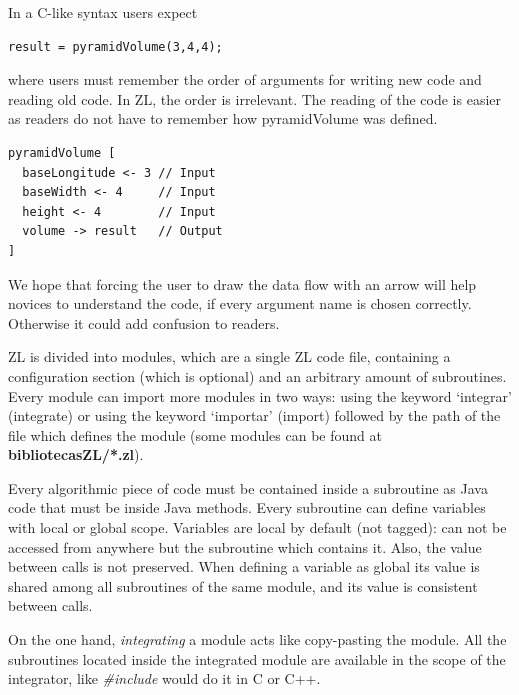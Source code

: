 \documentclass{report}
\begin{document}
	In a C-like syntax users expect
	
		\vspace{10px}
	
\begin{BVerbatim}
result = pyramidVolume(3,4,4);
\end{BVerbatim}
	
	\vspace{10px}
	
	where users must remember the order of arguments 
	for writing new code and reading old code.
	In ZL, the order is irrelevant. The reading of the code 
	is easier as readers do not have to remember how 
	pyramidVolume was defined. 
	
	\vspace{10px}
	
\begin{BVerbatim}
pyramidVolume [
  baseLongitude <- 3 // Input 
  baseWidth <- 4     // Input
  height <- 4        // Input
  volume -> result   // Output
]
\end{BVerbatim}

	\vspace{10px}

	We hope that forcing the user to draw the data flow with an arrow will help novices to understand the code, if every argument name is chosen correctly. Otherwise it could add confusion to readers.

	ZL is divided into modules, which are a single ZL code file, containing a configuration section (which is optional) and an arbitrary amount of subroutines. Every module can import more modules in two ways: using the keyword `integrar' (integrate) or using the keyword `importar' (import) followed by the path of the file which defines the module (some modules can be found at \textbf{bibliotecasZL/*.zl}).
	
	Every algorithmic piece of code must be contained inside a subroutine as Java code that must be inside Java methods. Every subroutine can define variables with local or global scope. Variables are local by default (not tagged): can not be accessed from anywhere but the subroutine which contains it. Also, the value between calls is not preserved. When defining a variable as global its value is shared among all subroutines of the same module, and its value is consistent between calls.  
	
	On the one hand, \textit{integrating} a module acts like copy-pasting the module. All the subroutines located inside the integrated module are available in the scope of the integrator, like \textit{\#include} would do it in C or C++.
	
\end{document}
